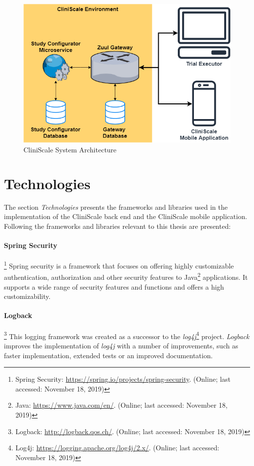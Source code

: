 \begin{figure}
  \includegraphics[width=\linewidth]{images/cs-architecture.png}
  \caption{CliniScale System Architecture}
  \label{fig:csarchitecture}
\end{figure}


\section{Technologies}
\label{technologies}

The section \textit{Technologies} presents the frameworks and libraries used in the implementation of the CliniScale back end and the CliniScale mobile application. Following the frameworks and libraries relevant to this thesis are presented:\\
\newline
\paragraph{Spring Security}\footnote{Spring Security: \url{https://spring.io/projects/spring-security}. (Online; last accessed:  November 18, 2019)} Spring security is a framework that focuses on offering highly customizable authentication, authorization and other security features to Java\footnote{Java: \url{https://www.java.com/en/}. (Online; last accessed:  November 18, 2019)} applications. It supports a wide range of security features and functions and offers a high customizability.

\paragraph{Logback}\footnote{Logback: \url{http://logback.qos.ch/}. (Online; last accessed:  November 18, 2019)} This logging framework was created as a successor to the \textit{log4j}\footnote{Log4j: \url{https://logging.apache.org/log4j/2.x/}. (Online; last accessed:  November 18, 2019)} project. \textit{Logback} improves the implementation of \textit{log4j} with a number of improvements, such as faster implementation, extended tests or an improved documentation.

